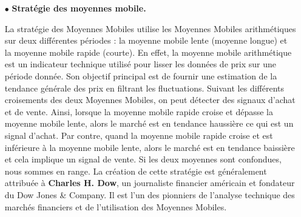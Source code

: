 \begin{itemize}
    \item[$\bullet$] \textbf{Stratégie des moyennes mobile.}
    \par{La stratégie des Moyennes Mobiles utilise les Moyennes Mobiles arithmétiques 
    sur deux différentes périodes : la moyenne mobile lente (moyenne longue) et la moyenne mobile rapide (courte).
    En effet, la moyenne mobile arithmétique est un indicateur technique utilisé pour lisser les données de prix sur une
    période donnée. Son objectif principal est de fournir une estimation de la tendance générale des prix en filtrant les fluctuations.
    Suivant les différents croisements des deux Moyennes Mobiles, on peut détecter des signaux d'achat et de vente.
    Ainsi, lorsque la moyenne mobile rapide croise et dépasse la moyenne mobile lente, alors le marché est en tendance haussière 
    ce qui est un signal d'achat. Par contre, quand la moyenne mobile rapide croise et est inférieure à la moyenne mobile lente,
    alors le marché est en tendance baissière et cela implique un signal de vente. 
    Si les deux moyennes sont confondues, nous sommes en range.
    La création de cette stratégie est généralement attribuée à \textbf{Charles H. Dow}, un journaliste financier américain et 
    fondateur du Dow Jones \& Company. Il est l'un des pionniers de l'analyse technique des marchés financiers et de 
    l'utilisation des Moyennes Mobiles.}


\end{itemize}
